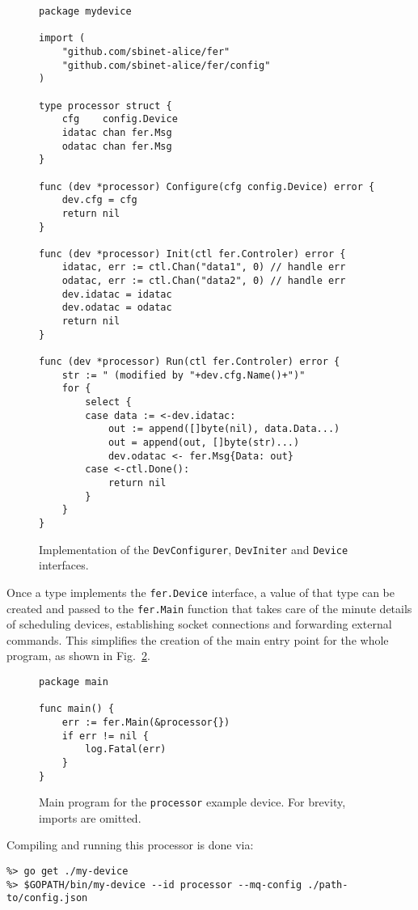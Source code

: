 \documentclass{webofc}
\begin{document}
\begin{figure}[h]
	\centering
\begin{verbatim}
package mydevice

import (
	"github.com/sbinet-alice/fer"
	"github.com/sbinet-alice/fer/config"
)

type processor struct {
	cfg    config.Device
	idatac chan fer.Msg
	odatac chan fer.Msg
}

func (dev *processor) Configure(cfg config.Device) error {
	dev.cfg = cfg
	return nil
}

func (dev *processor) Init(ctl fer.Controler) error {
	idatac, err := ctl.Chan("data1", 0) // handle err
	odatac, err := ctl.Chan("data2", 0) // handle err
	dev.idatac = idatac
	dev.odatac = odatac
	return nil
}

func (dev *processor) Run(ctl fer.Controler) error {
	str := " (modified by "+dev.cfg.Name()+")"
	for {
		select {
		case data := <-dev.idatac:
			out := append([]byte(nil), data.Data...)
			out = append(out, []byte(str)...)
			dev.odatac <- fer.Msg{Data: out}
		case <-ctl.Done():
			return nil
		}
	}
}
\end{verbatim}
\caption{Implementation of the \texttt{DevConfigurer}, \texttt{DevIniter} and \texttt{Device} interfaces.}
\label{fig-fer-processor}
\end{figure}

Once a type implements the \texttt{fer.Device} interface, a value of that type can be created and passed to the \texttt{fer.Main} function that takes care of the minute details of scheduling devices, establishing socket connections and forwarding external commands.
This simplifies the creation of the main entry point for the whole program, as shown in Fig.~\ref{fig-fer-main}.

\begin{figure}[h]
	\centering
\begin{verbatim}
package main

func main() {
	err := fer.Main(&processor{})
	if err != nil {
		log.Fatal(err)
	}
}
\end{verbatim}
	\caption{Main program for the \texttt{processor} example device. For brevity, imports are omitted.}
	\label{fig-fer-main}
\end{figure}

Compiling and running this processor is done via:
\begin{verbatim}
%> go get ./my-device
%> $GOPATH/bin/my-device --id processor --mq-config ./path-to/config.json
\end{verbatim}
\end{document}
